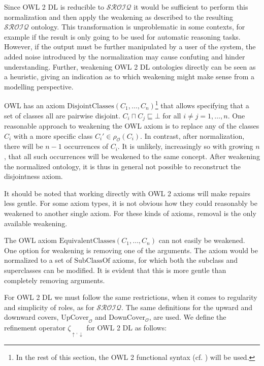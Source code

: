 Since OWL 2 DL is reducible to $\mathcal{SROIQ}$ it would be sufficient to perform this normalization and then apply the weakening as described to the resulting $\mathcal{SROIQ}$ ontology. This transformation is unproblematic in some contexts, for example if the result is only going to be used for automatic reasoning tasks. However, if the output must be further manipulated by a user of the system, the added noise introduced by the normalization may cause confuting and hinder understanding. Further, weakening OWL 2 DL ontologies directly can be seen as a heuristic, giving an indication as to which weakening might make sense from a modelling perspective.

\begin{example}
OWL has an axiom $\mathrm{DisjointClasses}(C_1, \dots, C_n)$\footnote{In the rest of this section, the OWL 2 functional syntax (cf. \cite{motik2012ontology}) will be used.} that allows specifying that a set of classes all are pairwise disjoint. $C_i \sqcap C_j \sqsubseteq \bot$ for all $i \not= j = 1, \dots, n$. One reasonable approach to weakening the OWL axiom is to replace any of the classes $C_i$ with a more specific class $C_i' \in \rho_\mathcal{O}(C_i)$. In contrast, after normalization, there will be $n - 1$ occurrences of $C_i$. It is unlikely, increasingly so with growing $n$, that all such occurrences will be weakened to the same concept. After weakening the normalized ontology, it is thus in general not possible to reconstruct the disjointness axiom.
\end{example}

It should be noted that working directly with OWL 2 axioms will make repairs less gentle. For some axiom types, it is not obvious how they could reasonably be weakened to another single axiom. For these kinds of axioms, removal is the only available weakening.

\begin{example}
The OWL axiom $\mathrm{EquivalentClasses}(C_1, \dots, C_n)$ can not easily be weakened. One option for weakening is removing one of the arguments. The axiom would be normalized to a set of $\mathrm{SubClassOf}$ axioms, for which both the subclass and superclasses can be modified. It is evident that this is more gentle than completely removing arguments.
\end{example}

For OWL 2 DL we must follow the same restrictions, when it comes to regularity and simplicity of roles, as for $\mathcal{SROIQ}$. The same definitions for the upward and downward covers, $\mathrm{UpCover}_\mathcal{O}$ and $\mathrm{DownCover}_\mathcal{O}$, are used. We define the refinement operator $\zeta_{\uparrow,\downarrow}$ for OWL 2 DL as follows:

